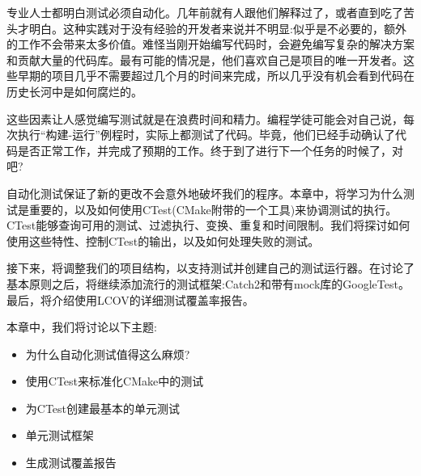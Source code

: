 专业人士都明白测试必须自动化。几年前就有人跟他们解释过了，或者直到吃了苦头才明白。这种实践对于没有经验的开发者来说并不明显:似乎是不必要的，额外的工作不会带来太多价值。难怪当刚开始编写代码时，会避免编写复杂的解决方案和贡献大量的代码库。最有可能的情况是，他们喜欢自己是项目的唯一开发者。这些早期的项目几乎不需要超过几个月的时间来完成，所以几乎没有机会看到代码在历史长河中是如何腐烂的。

这些因素让人感觉编写测试就是在浪费时间和精力。编程学徒可能会对自己说，每次执行“构建-运行”例程时，实际上都测试了代码。毕竟，他们已经手动确认了代码是否正常工作，并完成了预期的工作。终于到了进行下一个任务的时候了，对吧?

自动化测试保证了新的更改不会意外地破坏我们的程序。本章中，将学习为什么测试是重要的，以及如何使用CTest(CMake附带的一个工具)来协调测试的执行。CTest能够查询可用的测试、过滤执行、变换、重复和时间限制。我们将探讨如何使用这些特性、控制CTest的输出，以及如何处理失败的测试。

接下来，将调整我们的项目结构，以支持测试并创建自己的测试运行器。在讨论了基本原则之后，将继续添加流行的测试框架:Catch2和带有mock库的GoogleTest。最后，将介绍使用LCOV的详细测试覆盖率报告。

本章中，我们将讨论以下主题:

\begin{itemize}
\item 
为什么自动化测试值得这么麻烦?

\item 
使用CTest来标准化CMake中的测试

\item 
为CTest创建最基本的单元测试

\item 
单元测试框架

\item 
生成测试覆盖报告
\end{itemize}






















